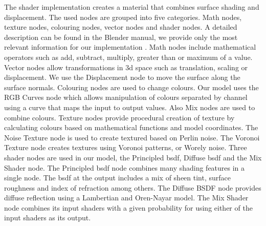 The shader implementation creates a material that combines surface shading and displacement. The used nodes are grouped into five categories. Math nodes, texture nodes, colouring nodes, vector nodes and shader nodes. A detailed description can be found in the Blender manual, we provide only the most relevant information for our implementation \cite{IntroductionManual}.
Math nodes include mathematical operators such as add, subtract, multiply, greater than or maximum of a value. Vector nodes allow transformations in \gls{3d} space such as translation, scaling or displacement. We use the Displacement node to move the surface along the surface normals. Colouring nodes are used to change colours. Our model uses the RGB Curves node which allows manipulation of colours separated by channel using a curve that maps the input to output values. Also Mix nodes are used to combine colours. Texture nodes provide procedural creation of texture by calculating colours based on mathematical functions and model coordinates. The Noise Texture node is used to create textured based on Perlin noise. The Voronoi Texture node creates textures using Voronoi patterns, or Worely noise. Three shader nodes are used in our model, the Principled \gls{bsdf}, Diffuse \gls{bsdf} and the Mix Shader node. The Principled \gls{bsdf} node combines many shading features in a single node. The \gls{bsdf} at the output includes a mix of sheen tint, surface roughness and index of refraction among others. The Diffuse BSDF node provides diffuse reflection using a Lambertian and Oren-Nayar model. The Mix Shader node combines its input shaders with a given probability for using either of the input shaders as its output.

